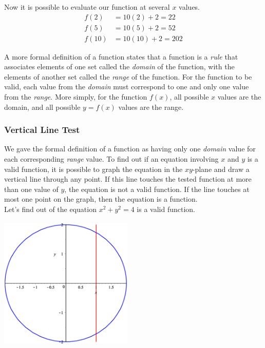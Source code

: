 \documentclass[oneside]{article}
\begin{document}
Now it is possible to evaluate our function at several $x$ values. 
\begin{align*}
	f(2) & = 10(2) + 2 = 22 \\
	f(5) & = 10(5) + 2 = 52 \\
	f(10) & = 10(10) + 2 = 202
\end{align*}

A more formal definition of a function states that a function is a \textit{rule} that associates elements of one set called the \textit{domain} of the function, with the elements of another set called the \textit{range} of the function. For the function to be valid, each value from the \textit{domain} must correspond to one and only one value from the \textit{range}. More simply, for the function $f(x)$, all possible $x$ values are the domain, and all possible $y = f(x)$ values are the range.

\subsubsection{Vertical Line Test}
We gave the formal definition of a function as having only one \textit{domain} value for each corresponding \textit{range} value. To find out if an equation involving $x$ and $y$ is a valid function, it is possible to graph the equation in the $xy$-plane and draw a vertical line through any point. If this line touches the tested function at more than one value of $y$, the equation is not a valid function. If the line touches at most one point on the graph, then the equation is a function. \\

Let's find out of the equation $x^2 + y^2 = 4$ is a valid function. 

\begin{center}
\includegraphics[width=2.5in, height=2.5in]{img/vert_line_test.eps} \\
\end{center}
\end{document}
